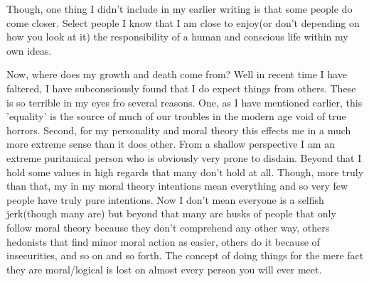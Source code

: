 \par Though, one thing I didn't include in my earlier writing is that some people do come closer. Select people I know that I am close to enjoy(or don't depending on how you look at it) the responsibility of a human and conscious life within my own ideas.
\par Now, where does my growth and death come from? Well in recent time I have faltered, I have subconsciously found that I do expect things from others. These is so terrible in my eyes fro several reasons. One, as I have mentioned earlier, this 'equality' is the source of much of our troubles in the modern age void of true horrors. Second, for my personality and moral theory this effects me in a much more extreme sense than it does other. From a shallow perspective I am an extreme puritanical person who is obviously very prone to disdain. Beyond that I hold some values in high regards that many don't hold at all. Though, more truly than that, my in my moral theory intentions mean everything and so very few people have truly pure intentions. Now I don't mean everyone is a selfish jerk(though many are) but beyond that many are husks of people that only follow moral theory because they don't comprehend any other way, others hedonists that find minor moral action as easier, others do it because of insecurities, and so on and so forth. The concept of doing things for the mere fact they are moral/logical is lost on almost every person you will ever meet. 
